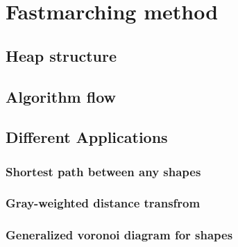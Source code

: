 \chapter{Fastmarching method} \label{chpt:fm}
\section{Heap structure}
\section{Algorithm flow}
\section{Different Applications}
\subsection{Shortest path between any shapes}
\subsection{Gray-weighted distance transfrom}
\subsection{Generalized voronoi diagram for shapes} \label{subsec:gvd}
